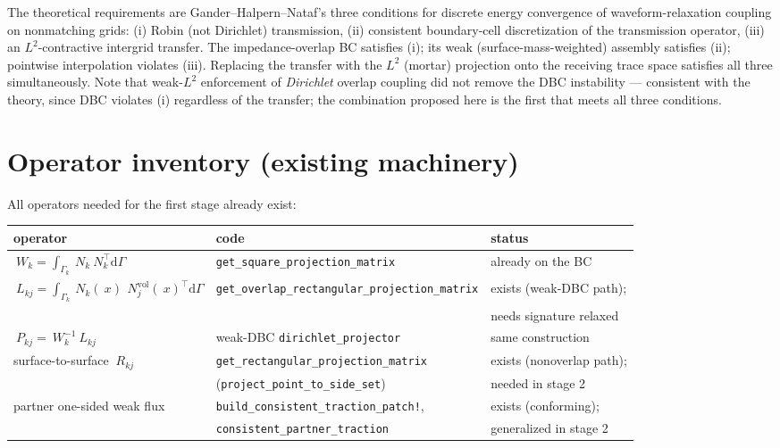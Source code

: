 \documentclass[11pt]{article}
\newcommand{\dd}{\mathrm{d}}
\begin{document}
The theoretical requirements are Gander--Halpern--Nataf's three
conditions for discrete energy convergence of waveform-relaxation
coupling on nonmatching grids: (i) Robin (not Dirichlet) transmission,
(ii) consistent boundary-cell discretization of the transmission
operator, (iii) an $L^2$-contractive intergrid transfer.  The
impedance-overlap BC satisfies (i); its weak (surface-mass-weighted)
assembly satisfies (ii); pointwise interpolation violates (iii).
Replacing the transfer with the $L^2$ (mortar) projection onto the
receiving trace space satisfies all three simultaneously.  Note that
weak-$L^2$ enforcement of \emph{Dirichlet} overlap coupling did not
remove the DBC instability --- consistent with the theory, since DBC
violates (i) regardless of the transfer; the combination proposed here
is the first that meets all three conditions.

\section{Operator inventory (existing machinery)}

All operators needed for the first stage already exist:

\begin{center}
\small
\begin{tabular}{lll}
\toprule
operator & code & status \\
\midrule
$~W_k = \int_{\Gamma_k} ~N_k ~N_k^\top \dd\Gamma$ &
  \texttt{get\_square\_projection\_matrix} &
  already on the BC \\[0.3em]
$~L_{kj} = \int_{\Gamma_k} ~N_k(~x)\, ~N_j^{\mathrm{vol}}(~x)^\top \dd\Gamma$ &
  \texttt{get\_overlap\_rectangular\_projection\_matrix} &
  exists (weak-DBC path); \\
  & & needs signature relaxed \\[0.3em]
$~P_{kj} = ~W_k^{-1} ~L_{kj}$ &
  weak-DBC \texttt{dirichlet\_projector} &
  same construction \\[0.3em]
surface-to-surface $~R_{kj}$ &
  \texttt{get\_rectangular\_projection\_matrix} &
  exists (nonoverlap path); \\
  & (\texttt{project\_point\_to\_side\_set}) & needed in stage 2 \\[0.3em]
partner one-sided weak flux &
  \texttt{build\_consistent\_traction\_patch!}, &
  exists (conforming); \\
  & \texttt{consistent\_partner\_traction} & generalized in stage 2 \\
\bottomrule
\end{tabular}
\end{center}
\end{document}
